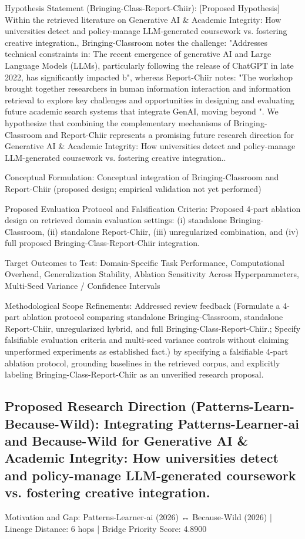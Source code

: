 \documentclass[10pt,twocolumn,letterpaper]{article}
\begin{document}
Hypothesis Statement (Bringing-Class-Report-Chiir): [Proposed Hypothesis] Within the retrieved literature on Generative AI \& Academic Integrity: How universities detect and policy-manage LLM-generated coursework vs. fostering creative integration., Bringing-Classroom notes the challenge: "Addresses technical constraints in: The recent emergence of generative AI and Large Language Models (LLMs), particularly following the release of ChatGPT in late 2022, has significantly impacted b", whereas Report-Chiir notes: "The workshop brought together researchers in human information interaction and information retrieval to explore key challenges and opportunities in designing and evaluating future academic search systems that integrate GenAI, moving beyond ". We hypothesize that combining the complementary mechanisms of Bringing-Classroom and Report-Chiir represents a promising future research direction for Generative AI \& Academic Integrity: How universities detect and policy-manage LLM-generated coursework vs. fostering creative integration..

Conceptual Formulation: Conceptual integration of Bringing-Classroom and Report-Chiir (proposed design; empirical validation not yet performed)

Proposed Evaluation Protocol and Falsification Criteria: Proposed 4-part ablation design on retrieved domain evaluation settings: (i) standalone Bringing-Classroom, (ii) standalone Report-Chiir, (iii) unregularized combination, and (iv) full proposed Bringing-Class-Report-Chiir integration.

Target Outcomes to Test: Domain-Specific Task Performance, Computational Overhead, Generalization Stability, Ablation Sensitivity Across Hyperparameters, Multi-Seed Variance / Confidence Intervals

Methodological Scope Refinements: Addressed review feedback (Formulate a 4-part ablation protocol comparing standalone Bringing-Classroom, standalone Report-Chiir, unregularized hybrid, and full Bringing-Class-Report-Chiir.; Specify falsifiable evaluation criteria and multi-seed variance controls without claiming unperformed experiments as established fact.) by specifying a falsifiable 4-part ablation protocol, grounding baselines in the retrieved corpus, and explicitly labeling Bringing-Class-Report-Chiir as an unverified research proposal.

\subsection{Proposed Research Direction (Patterns-Learn-Because-Wild): Integrating Patterns-Learner-ai and Because-Wild for Generative AI \& Academic Integrity: How universities detect and policy-manage LLM-generated coursework vs. fostering creative integration.}
Motivation and Gap: Patterns-Learner-ai (2026) ↔ Because-Wild (2026) | Lineage Distance: 6 hops | Bridge Priority Score: 4.8900
\end{document}
